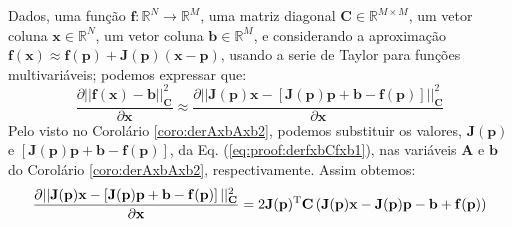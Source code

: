 \begin{myproofT}\label{proof:theo:derfxbCfxb}
Dados,
uma função $\mathbf{f}:\mathbb{R}^{N} \rightarrow \mathbb{R}^{M}$, 
uma matriz diagonal $\mathbf{C}\in \mathbb{R}^{M\times M}$, 
um vetor coluna $\mathbf{x}\in \mathbb{R}^{N}$, 
um vetor coluna $\mathbf{b}\in \mathbb{R}^{M}$, 
e considerando a aproximação
$\mathbf{f}(\mathbf{x})\approx \mathbf{f}(\mathbf{p})+\mathbf{J}(\mathbf{p})\left(\mathbf{x}-\mathbf{p}\right)$,
usando a serie de Taylor para funções multivariáveis;
podemos expressar que:
\begin{equation}\label{eq:proof:derfxbCfxb1}
\frac{\partial ||\mathbf{f}(\mathbf{x})-\mathbf{b}||_{\mathbf{C}}^2}{\partial \mathbf{x}} \approx
\frac{\partial ||\mathbf{J}(\mathbf{p})\mathbf{x}-\left[\mathbf{J}(\mathbf{p})\mathbf{p}+\mathbf{b}-\mathbf{f}(\mathbf{p})\right]||_{\mathbf{C}}^2}{\partial \mathbf{x}}
\end{equation}
Pelo visto no Corolário \ref{coro:derAxbAxb2}, podemos substituir os valores,
$\mathbf{J}(\mathbf{p})$ e 
$\left[\mathbf{J}(\mathbf{p})\mathbf{p}+\mathbf{b}-\mathbf{f}(\mathbf{p})\right]$,
da Eq. (\ref{eq:proof:derfxbCfxb1}), nas variáveis $\mathbf{A}$ e $\mathbf{b}$ 
do Corolário \ref{coro:derAxbAxb2}, respectivamente. Assim obtemos:
\begin{equation}\label{eq:proof:derfxbCfxb2}
\frac{\partial ||\mathbf{J}(\mathbf{p})\mathbf{x}-\left[\mathbf{J}(\mathbf{p})\mathbf{p}+\mathbf{b}-\mathbf{f}(\mathbf{p})\right]||_{\mathbf{C}}^2}{\partial \mathbf{x}}  = 
2 \mathbf{J}(\mathbf{p})^{\mathrm{T}}\mathbf{C}\left( \mathbf{J}(\mathbf{p})\mathbf{x}-\mathbf{J}(\mathbf{p})\mathbf{p}-\mathbf{b}+\mathbf{f}(\mathbf{p})\right) 
\end{equation}
\end{myproofT}


